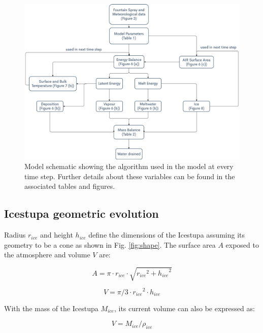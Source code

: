 \documentclass[utf8]{frontiersSCNS} %
\begin{document}
  \begin{figure} \begin{center} \includegraphics[width=15 cm]{Figures/Figure_4.jpg} \end{center} \caption{Model
schematic showing the algorithm used in the model at every time step. Further details about these variables can be
found in the associated tables and figures.} \label{fig:schema} \end{figure}

\subsection{Icestupa geometric evolution}

Radius $r_{ice}$ and height $h_{ice}$ define the dimensions of the Icestupa assuming its geometry to be a cone as
shown in Fig. \ref{fig:shape}. The surface area $A$ exposed to the atmosphere and volume $V$ are:

\begin{equation} A = \pi \cdot r_{ice} \cdot \sqrt{{r_{ice}}^2 + {h_{ice}}^ 2} \label{eqn:A} \end{equation}

\begin{equation} V = \pi/3 \cdot {r_{ice}}^2 \cdot h_{ice} \label{eqn:V} \end{equation}

With the mass of the Icestupa $M_{ice}$, its current volume can also be expressed as:

\begin{equation} V = M_{ice} / \rho_{ice} \label{eqn:V1} \end{equation}
\end{document}
